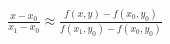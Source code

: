 \documentclass[preview]{standalone}
\begin{document}
\begin{align*}
\frac{x - x_0}{x_1 - x_0}  \approx  \frac{f(x, y) - f(x_0, y_0)}{f(x_1, y_0) - f(x_0, y_0)}
\end{align*}
\end{document}
